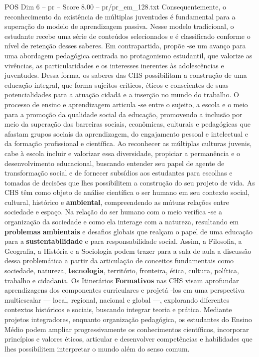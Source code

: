 \begin{textsample}{POS Dim 6 – pr – Score 8.00 – pr/pr\_em\_128.txt}
Consequentemente, o reconhecimento da existência de múltiplas juventudes é fundamental para a superação do modelo de aprendizagem passiva.
Nesse modelo tradicional, o estudante recebe uma série de conteúdos selecionados e é classificado conforme o nível de retenção desses saberes.
Em contrapartida, propõe -se um avanço para uma abordagem pedagógica centrada no protagonismo estudantil, que valorize as vivências, as particularidades e os interesses inerentes às adolescências e juventudes.
Dessa forma, os saberes das CHS possibilitam a construção de uma educação integral, que forma sujeitos críticos, éticos e conscientes de suas potencialidades para a atuação cidadã e a inserção no mundo do trabalho.
O processo de ensino e aprendizagem articula -se entre o sujeito, a escola e o meio para a promoção da qualidade social da educação, promovendo a inclusão por meio da superação das barreiras sociais, econômicas, culturais e pedagógicas que afastam grupos sociais da aprendizagem, do engajamento pessoal e intelectual e da formação profissional e científica.
Ao reconhecer as múltiplas culturas juvenis, cabe à escola incluir e valorizar essa diversidade, propiciar a permanência e o desenvolvimento educacional, buscando entender seu papel de agente de transformação social e de fornecer subsídios aos estudantes para escolhas e tomadas de decisões que lhes possibilitem a construção do seu projeto de vida.
As CHS têm como objeto de análise científica o ser humano em seu contexto social, cultural, histórico e \textbf{ambiental}, compreendendo as mútuas relações entre sociedade e espaço.
Na relação do ser humano com o meio verifica -se a organização da sociedade e como ela interage com a natureza, resultando em \textbf{problemas} \textbf{ambientais} e desafios globais que realçam o papel de uma educação para a \textbf{sustentabilidade} e para responsabilidade social.
Assim, a Filosofia, a Geografia, a História e a Sociologia podem trazer para a sala de aula a discussão dessa problemática a partir da articulação de conceitos fundamentais como sociedade, natureza, \textbf{tecnologia}, território, fronteira, ética, cultura, política, trabalho e cidadania.
Os Itinerários \textbf{Formativos} nas CHS visam aprofundar aprendizagens dos componentes curriculares e projetá -los em uma perspectiva multiescalar — local, regional, nacional e global —, explorando diferentes contextos históricos e sociais, buscando integrar teoria e prática.
Mediante projetos integradores, enquanto organização pedagógica, os estudantes do Ensino Médio podem ampliar progressivamente os conhecimentos científicos, incorporar princípios e valores éticos, articular e desenvolver competências e habilidades que lhes possibilitem interpretar o mundo além do senso comum.

\end{textsample}
